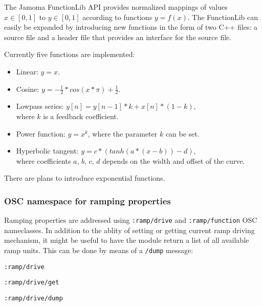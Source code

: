 \documentclass{sig-alternate}
\begin{document}
The Jamoma FunctionLib API provides normalized mappings of values $x \in [0,1]$ to $y \in [0,1]$ according to functions $y = f(x)$. The FunctionLib can easily be expanded by introducing new functions in the form of two C++ files: a source file and a header file that provides an interface for the source file.

Currently five functions are implemented: 

\begin{itemize}

	\item Linear: $y = x$.

	\item Cosine: $y = - \frac{1}{2} * cos(x * \pi ) + \frac{1}{2} $.

	\item Lowpass series: $y[n] = y[n-1] * k + x[n] * (1-k)$, \\ where $k$ is a feedback coefficient.

	\item Power function: $ y = x^{k} $, where the parameter $k$ can be set.

	\item Hyperbolic tangent: $ y = c * (tanh(a*(x-b)) - d) $, \\ where coefficients $a$, $b$, $c$, $d$ depends on the width and offset of the curve.
	
\end{itemize}

There are plans to introduce exponential functions.




\subsubsection{OSC namespace for ramping properties} %
\label{ssub:osc_namespace_for_ramping_properties}

Ramping properties are addressed using \texttt{:ramp/drive} and \texttt{:ramp/function} OSC nameclasses. In addition to the ablity of setting or getting current ramp driving mechanism, it might be useful to have the module return a list of all available ramp units. This can be done by means of a \texttt{/dump} message:

\texttt{:ramp/drive}

\texttt{:ramp/drive/get}

\texttt{:ramp/drive/dump}
\end{document}
